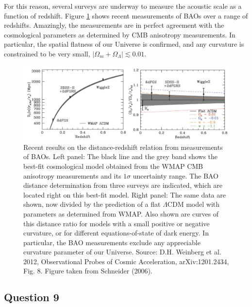 \documentclass[a4paper,11pt]{article}
\begin{document}
{\noindent}For this reason, several surveys are underway to measure the acoustic scale as a function of redshift. Figure \ref{fig:BAOs} shows recent measurements of BAOs over a range of redshifts. Amazingly, the measurements are in perfect agreement with the cosmological parameters as determined by CMB anisotropy measurements. In particular, the spatial flatness of our Universe is confirmed, and any curvature is constrained to be very small, $\lvert\Omega_m+\Omega_\Lambda\rvert\lesssim0.01$.

\begin{figure}[t]
    \includegraphics[width=16cm]{figures/BAOs.png}
    \centering
    \caption{\footnotesize{Recent results on the distance-redshift relation from measurements of BAOs. Left panel: The black line and the grey band shows the best-fit cosmological model obtained from the WMAP CMB anisotropy measurements and its $1\sigma$  uncertainty range. The BAO distance determination from three surveys are indicated, which are located right on this best-fit model. Right panel: The same data are shown, now divided by the prediction of a flat $\Lambda$CDM model with parameters as determined from WMAP. Also shown are curves of this distance ratio for models with a small positive or negative curvature, or for different equations-of-state of dark energy. In particular, the BAO measurements exclude any appreciable curvature parameter of our Universe. Source: D.H. Weinberg et al. 2012, Observational Probes of Cosmic Acceleration, arXiv:1201.2434, Fig. 8. Figure taken from Schneider (2006).}}
    \label{fig:BAOs}
\end{figure}


%
%

\newpage
\subsection{Question 9}
\end{document}
